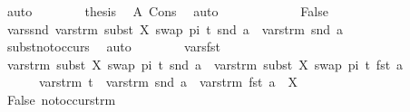 \begin{isabellebody}
\ auto\isanewline
\ \ \ \ \ \ \isamarkupfalse%
\ {\isacharquery}{\kern0pt}thesis\ \isamarkupfalse%
\ A\ Cons\ \isamarkupfalse%
\ auto\isanewline
\ \ \ \ \isamarkupfalse%
\isanewline
\ \ \ \ \ \ \isamarkupfalse%
\ False\isanewline
\ \ \ \ \ \ \isamarkupfalse%
\ vars{\isacharunderscore}{\kern0pt}snd{\isacharcolon}{\kern0pt}\ {\isachardoublequoteopen}vars{\isacharunderscore}{\kern0pt}trm\ {\isacharparenleft}{\kern0pt}subst\ {\isacharbrackleft}{\kern0pt}{\isacharparenleft}{\kern0pt}X{\isacharcomma}{\kern0pt}\ swap\ pi\ t{\isacharparenright}{\kern0pt}{\isacharbrackright}{\kern0pt}\ {\isacharparenleft}{\kern0pt}snd\ a{\isacharparenright}{\kern0pt}{\isacharparenright}{\kern0pt}\ {\isacharequal}{\kern0pt}\ vars{\isacharunderscore}{\kern0pt}trm\ {\isacharparenleft}{\kern0pt}snd\ a{\isacharparenright}{\kern0pt}{\isachardoublequoteclose}\isanewline
\ \ \ \ \ \ \ \ \isamarkupfalse%
\ subst{\isacharunderscore}{\kern0pt}not{\isacharunderscore}{\kern0pt}occurs\ \isamarkupfalse%
\ auto\isanewline
\ \ \ \ \ \ \isamarkupfalse%
\ vars{\isacharunderscore}{\kern0pt}fst\isanewline
\ \ \ \ \ \ \isamarkupfalse%
\ {\isachardoublequoteopen}vars{\isacharunderscore}{\kern0pt}trm\ {\isacharparenleft}{\kern0pt}subst\ {\isacharbrackleft}{\kern0pt}{\isacharparenleft}{\kern0pt}X{\isacharcomma}{\kern0pt}\ swap\ pi\ t{\isacharparenright}{\kern0pt}{\isacharbrackright}{\kern0pt}\ {\isacharparenleft}{\kern0pt}snd\ a{\isacharparenright}{\kern0pt}{\isacharparenright}{\kern0pt}\ {\isasymunion}\ vars{\isacharunderscore}{\kern0pt}trm\ {\isacharparenleft}{\kern0pt}subst\ {\isacharbrackleft}{\kern0pt}{\isacharparenleft}{\kern0pt}X{\isacharcomma}{\kern0pt}\ swap\ pi\ t{\isacharparenright}{\kern0pt}{\isacharbrackright}{\kern0pt}\ {\isacharparenleft}{\kern0pt}fst\ a{\isacharparenright}{\kern0pt}{\isacharparenright}{\kern0pt}\ \ {\isacharequal}{\kern0pt}\ \isanewline
\ \ \ \ \ \ vars{\isacharunderscore}{\kern0pt}trm\ t\ {\isasymunion}\ vars{\isacharunderscore}{\kern0pt}trm\ {\isacharparenleft}{\kern0pt}snd\ a{\isacharparenright}{\kern0pt}\ {\isasymunion}\ vars{\isacharunderscore}{\kern0pt}trm\ {\isacharparenleft}{\kern0pt}fst\ a{\isacharparenright}{\kern0pt}\ {\isacharminus}{\kern0pt}\ {\isacharbraceleft}{\kern0pt}X{\isacharbraceright}{\kern0pt}{\isachardoublequoteclose}\isanewline
\ \ \ \ \ \ \ \ \isamarkupfalse%
\ False\ not{\isacharunderscore}{\kern0pt}occurs{\isacharunderscore}{\kern0pt}trm\ \isamarkupfalse%

\end{isabellebody}
